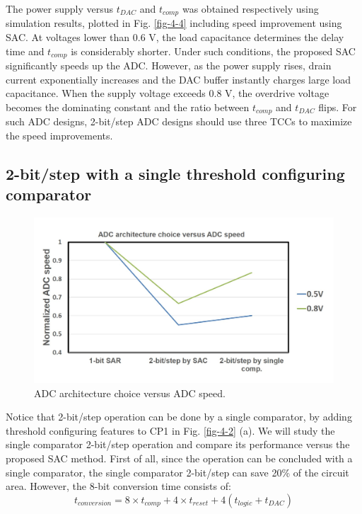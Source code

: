 The power supply versus $t_{DAC}$ and $t_{comp}$ was obtained respectively using simulation results, plotted in Fig. \ref{fig-4-4} including speed improvement using SAC. At voltages lower than 0.6 V, the load capacitance determines the delay time and $t_{comp}$ is considerably shorter. Under such conditions, the proposed SAC significantly speeds up the ADC. However, as the power supply rises, drain current exponentially increases and the DAC buffer instantly charges large load capacitance. 
When the supply voltage exceeds 0.8 V, the overdrive voltage becomes the dominating constant and the ratio between $t_{comp}$ and $t_{DAC}$ flips. For such ADC designs, 2-bit/step ADC designs should use three TCCs to maximize the speed improvements.

\subsection{2-bit/step with a single threshold configuring comparator}
\begin{figure}
\centering
  \includegraphics[width=1\textwidth]{figure/chap4/comp-vs-adc.jpg}
  \caption{ADC architecture choice versus ADC speed.}
  \label{fig-4-comp-vs}
\end{figure}
Notice that 2-bit/step operation can be done by a single comparator, by adding threshold configuring features to CP1 in Fig. \ref{fig-4-2} (a).
We will study the single comparator 2-bit/step operation and compare its performance versus the proposed SAC method.
First of all, since the operation can be concluded with a single comparator, the single comparator 2-bit/step can save 20\% of the circuit area. However, the 8-bit conversion time consists of:
\begin{equation}
    t_{conversion} = 8 \times t_{comp} + 4 \times t_{reset} + 4(t_{logic}+t_{DAC})
\end{equation}
